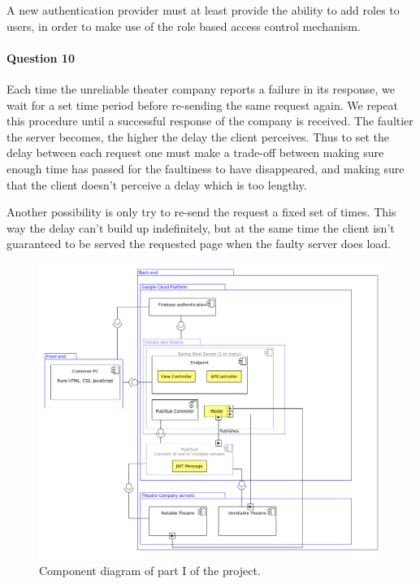 \documentclass{ds-report}
\begin{document}
	A new authentication provider must at least provide the ability to add roles to users, in order to make use of the role based access control mechanism. 
	
	\paragraph{Question 10}
	Each time the unreliable theater company reports a failure in its response, we wait for a set time period before re-sending the same request again. We repeat this procedure until a successful response of the company is received. The faultier the server becomes, the higher the delay the client perceives. Thus to set the delay between each request 
	one must make a trade-off between making sure enough time has passed for the faultiness to have disappeared, and making sure that the client doesn't perceive a delay which is too lengthy. 
	
	Another possibility is only try to re-send the request a fixed set of times. This way the delay can't build up indefinitely, but at the same time the client isn't guaranteed to be served the requested page when the faulty server does load. 
	\clearpage
	
	
	\begin{figure}
		\begin{center}
			\includegraphics[width=\linewidth]{../diagrams/ComponentDiagram}
		\end{center}
	\caption{Component diagram of part I of the project.}
	\label{fig:component}
	\end{figure}

	
\end{document}

